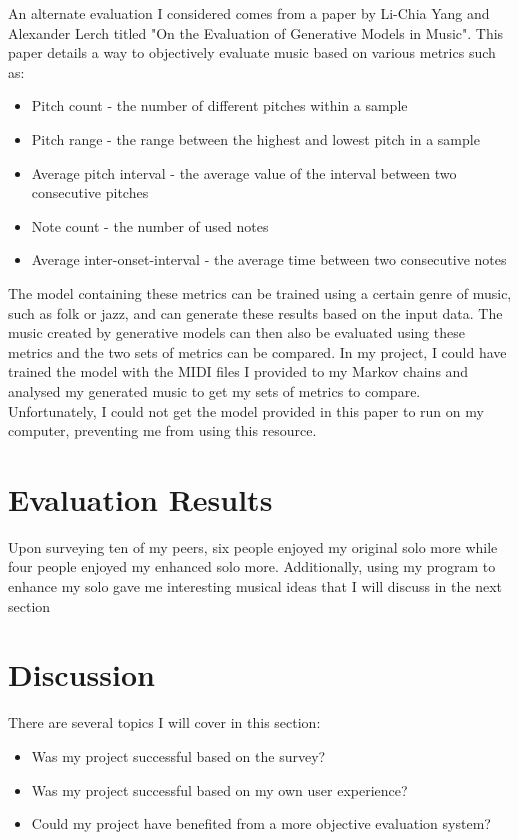 \documentclass[10pt,twocolumn]{article}
\begin{document}
    An alternate evaluation I considered comes from a paper by Li-Chia Yang and Alexander Lerch titled "On the Evaluation of Generative Models in Music"\cite{Evaluation}. This paper details a way to objectively evaluate music based on various metrics such as:
    \begin{itemize}
        \item Pitch count - the number of different pitches within a sample
        \item Pitch range - the range between the highest and lowest pitch in a sample
        \item Average pitch interval - the average value of the interval between two consecutive pitches
        \item Note count - the number of used notes
        \item Average inter-onset-interval - the average time between two consecutive notes
    \end{itemize}
    The model containing these metrics can be trained using a certain genre of music, such as folk or jazz, and can generate these results based on the input data. The music created by generative models can then also be evaluated using these metrics and the two sets of metrics can be compared. In my project, I could have trained the model with the MIDI files I provided to my Markov chains and analysed my generated music to get my sets of metrics to compare. Unfortunately, I could not get the model provided in this paper to run on my computer, preventing me from using this resource. 

\section{Evaluation Results}
    Upon surveying ten of my peers, six people enjoyed my original solo more while four people enjoyed my enhanced solo more. Additionally, using my program to enhance my solo gave me interesting musical ideas that I will discuss in the next section

\section{Discussion}
    There are several topics I will cover in this section:
    \begin{itemize}
        \item Was my project successful based on the survey?
        \item Was my project successful based on my own user experience?
        \item Could my project have benefited from a more objective evaluation system?
    \end{itemize}
\end{document}
